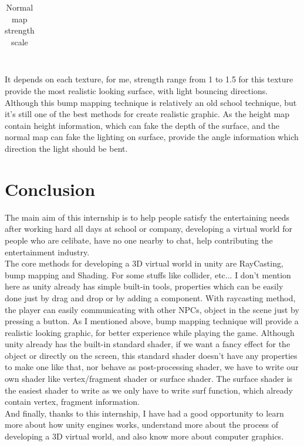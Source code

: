 \documentclass[a4paper, 13pt]{extarticle}
\begin{document}
{\begin{table}[h]
\begin{tabular}{|M{2.5cm}|M{4cm}|M{4cm}|}
 		\end{tabular}
 		\newline\newline
 		\caption{Normal map strength scale}\label{tab1}
 	\end{table} \\
 	It depends on each texture, for me, strength range from 1 to 1.5 for this texture provide the most realistic looking surface, with light bouncing directions. Although this bump mapping technique is relatively an old school technique, but it's still one of the best methods for create realistic graphic. As the height map contain height information, which can fake the depth of the surface, and the normal map can fake the lighting on surface, provide the angle information which direction the light should be bent. 
 	 
 	\section{Conclusion}  
 	The main aim of this internship is to help people satisfy the entertaining needs after working hard all days at school or company, developing a virtual world for people who are celibate, have no one nearby to chat, help contributing the entertainment industry. \\ The core methods for developing a 3D virtual world in unity are RayCasting, bump mapping and Shading. For some stuffs like collider, etc... I don't mention here as unity already has simple built-in tools, properties which can be easily done just by drag and drop or by adding a component. With raycasting method, the player can easily communicating with other NPCs, object in the scene just by pressing a button. As I mentioned above, bump mapping technique will provide a realistic looking graphic, for better experience while playing the game. Although unity already has the built-in standard shader, if we want a fancy effect for the object or directly on the screen, this standard shader doesn't have any properties to make one like that, nor behave as post-processing shader, we have to write our own shader like vertex/fragment shader or surface shader. The surface shader is the easiest shader to write as we only have to write surf function, which already contain vertex, fragment information. \\ And finally, thanks to this internship, I have had a good opportunity to learn more about how unity engines works, understand more about the process of developing a 3D virtual world, and also know more about computer graphics.   
}
\end{document}
